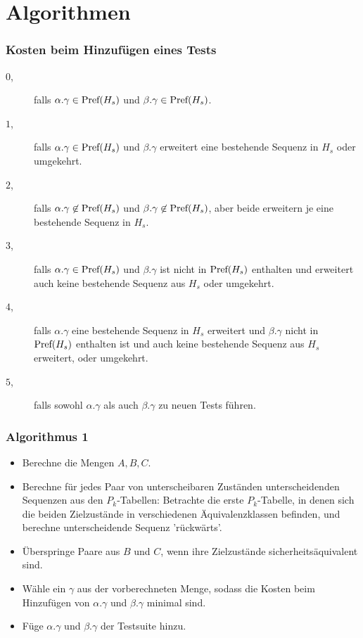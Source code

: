\section{Algorithmen}

\begin{frame}
  \frametitle{Kosten beim Hinzufügen eines Tests}
  \begin{description}
    \item[$0$,] falls $\alpha.\gamma\in\text{\rm Pref}(H_s)$ und $\beta.\gamma\in\text{\rm Pref}(H_s)$. 
    \item[$1$,] falls $\alpha.\gamma\in\text{\rm Pref}(H_s)$ und $\beta.\gamma$ erweitert eine bestehende Sequenz in $H_s$ oder umgekehrt.
    \item[$2$,] falls $\alpha.\gamma\not\in\text{\rm Pref}(H_s)$ und $\beta.\gamma\not\in\text{\rm Pref}(H_s)$, aber beide erweitern je eine bestehende Sequenz in $H_s$.
    \item[$3$,] falls $\alpha.\gamma\in\text{\rm Pref}(H_s)$ und $\beta.\gamma$ ist nicht in $\text{\rm Pref}(H_s)$ enthalten und erweitert auch keine bestehende Sequenz aus  $H_s$ oder umgekehrt.
    \item[$4$,] falls $\alpha.\gamma$ eine bestehende Sequenz in $H_s$ erweitert und $\beta.\gamma$ nicht in $\text{\rm Pref}(H_s)$ enthalten ist und auch keine bestehende Sequenz aus $H_s$ erweitert, oder umgekehrt.
    \item[$5$,] falls sowohl  $\alpha.\gamma$ als auch $\beta.\gamma$ zu neuen Tests führen.
\end{description}
\end{frame}
    
\begin{frame}
  \frametitle{Algorithmus 1}
  \begin{itemize}
    \item Berechne die Mengen $A,B,C$.
    \item Berechne für jedes Paar von unterscheibaren Zuständen unterscheidenden Sequenzen aus den $P_k$-Tabellen:
    Betrachte die erste $P_k$-Tabelle, in denen sich die beiden Zielzustände in verschiedenen Äquivalenzklassen befinden, und berechne unterscheidende Sequenz 'rückwärts'.
    \item Überspringe Paare aus $B$ und $C$, wenn ihre Zielzustände sicherheitsäquivalent sind.
    \item Wähle ein $\gamma$ aus der vorberechneten Menge, sodass die Kosten beim Hinzufügen von $\alpha.\gamma$ und $\beta.\gamma$ minimal sind.
    \item Füge $\alpha.\gamma$ und $\beta.\gamma$ der Testsuite hinzu.
  \end{itemize}
\end{frame}

